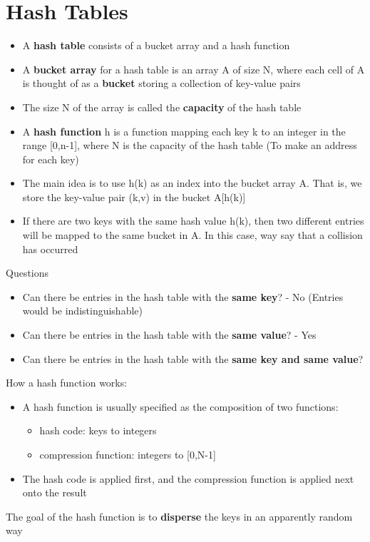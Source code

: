 \documentclass{article}[18pt]
\begin{document}
\section{Hash Tables}
\begin{itemize}
\item A \textbf{hash table} consists of a bucket array and a hash function
\item A \textbf{bucket array} for a hash table is an array A of size N, where each cell of A is thought of as a \textbf{bucket} storing a collection of key-value pairs
\item The size N of the array is called the \textbf{capacity} of the hash table
\item A \textbf{hash function} h is a function mapping each key k to an integer in the range [0,n-1], where N is the capacity of the hash table (To make an address for each key)
\item The main idea is to use h(k) as an index into the bucket array A. That is, we store the key-value pair (k,v) in the bucket A[h(k)]
\item If there are two keys with the same hash value h(k), then two different entries will be mapped to the same bucket in A. In this case, way say that a collision has occurred
\end{itemize}
Questions
\begin{itemize}
\item Can there be entries in the hash table with the \textbf{same key}? - No (Entries would be indistinguishable)
\item Can there be entries in the hash table with the \textbf{same value}? - Yes 
\item Can there be entries in the hash table with the \textbf{same key and same value}?
\end{itemize}
How a hash function works:
\begin{itemize}
\item A hash function is usually specified as the composition of two functions:
\begin{itemize}
\item hash code: keys to integers
\item compression function: integers to [0,N-1] 
\end{itemize}
\item The hash code is applied first, and the compression function is applied next onto the result
\end{itemize}
The goal of the hash function is to \textbf{disperse} the keys in an apparently random way
\end{document}
